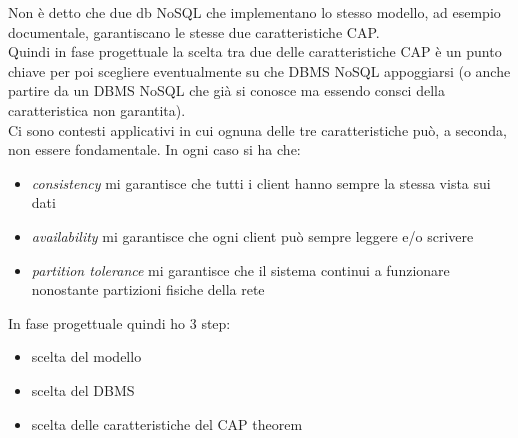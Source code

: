 \documentclass[a4paper,12pt, oneside]{book}
\begin{document}
Non è detto che due db NoSQL che implementano lo stesso modello, ad esempio
documentale, garantiscano le stesse due caratteristiche CAP.\\
Quindi in fase progettuale la scelta tra due delle caratteristiche CAP è un
punto chiave per poi scegliere eventualmente su che DBMS NoSQL appoggiarsi (o
anche partire da un DBMS NoSQL che già si conosce ma essendo consci della
caratteristica non garantita).\\
Ci sono contesti applicativi in cui ognuna delle tre caratteristiche può, a
seconda, non essere fondamentale. In ogni caso si ha che:
\begin{itemize}
  \item \textit{consistency} mi garantisce che tutti i client hanno sempre la
  stessa vista sui dati
  \item \textit{availability} mi garantisce che ogni client può sempre leggere
  e/o scrivere
  \item \textit{partition tolerance} mi garantisce che il sistema continui a
  funzionare nonostante partizioni fisiche della rete
\end{itemize}
In fase progettuale quindi ho 3 step:
\begin{itemize}
  \item scelta del modello
  \item scelta del DBMS
  \item scelta delle caratteristiche del CAP theorem
\end{itemize}
\end{document}
